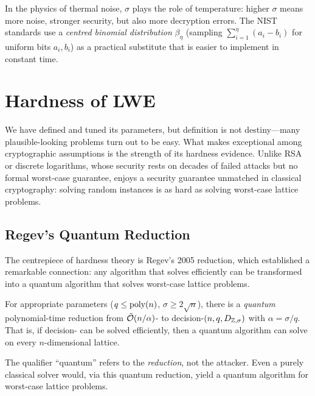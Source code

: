 In the physics of thermal noise, $\sigma$ plays the role of temperature: higher $\sigma$ means more noise, stronger security, but also more decryption errors.  The NIST standards use a \emph{centred binomial distribution} $\beta_\eta$ (sampling $\sum_{i=1}^{\eta}(a_i - b_i)$ for uniform bits $a_i, b_i$) as a practical substitute that is easier to implement in constant time.


\section{Hardness of LWE}
\label{sec:lwe-hardness}

We have defined \lwe{} and tuned its parameters, but definition is not destiny---many plausible-looking problems turn out to be easy.  What makes \lwe{} exceptional among cryptographic assumptions is the strength of its hardness evidence.  Unlike RSA or discrete logarithms, whose security rests on decades of failed attacks but no formal worst-case guarantee, \lwe{} enjoys a security guarantee unmatched in classical cryptography: solving random \lwe{} instances is as hard as solving worst-case lattice problems.

\subsection{Regev's Quantum Reduction}
\label{subsec:regev-reduction}

The centrepiece of \lwe{} hardness theory is Regev's 2005 reduction, which established a remarkable connection: any algorithm that solves \lwe{} efficiently can be transformed into a quantum algorithm that solves worst-case lattice problems.

\begin{theorem}
\label{thm:regev}
For appropriate parameters ($q \leq \operatorname{poly}(n)$, $\sigma \geq 2\sqrt{n}$), there is a \emph{quantum} polynomial-time reduction from $\tilde{\mathcal{O}}(n/\alpha)$-\gapsvp{} to decision-\lwe{}$(n, q, D_{\mathbb{Z},\sigma})$ with $\alpha = \sigma/q$.  That is, if decision-\lwe{} can be solved efficiently, then a quantum algorithm can solve \gapsvp{} on every $n$-dimensional lattice.
\end{theorem}

The qualifier ``quantum'' refers to the \emph{reduction}, not the attacker.  Even a purely classical \lwe{} solver would, via this quantum reduction, yield a quantum algorithm for worst-case lattice problems.

